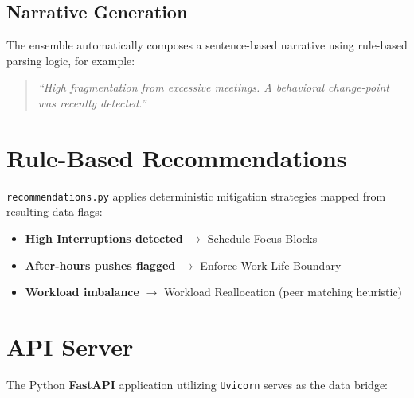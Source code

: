 \documentclass[12pt, a4paper, oneside]{report}
\begin{document}
\subsection{Narrative Generation}

The ensemble automatically composes a sentence-based narrative using rule-based parsing logic, for example:
\begin{quote}
    \emph{``High fragmentation from excessive meetings. A behavioral change-point was recently detected.''}
\end{quote}

\section{Rule-Based Recommendations}
\label{sec:recommendations}

\texttt{recommendations.py} applies deterministic mitigation strategies mapped from resulting data flags:

\begin{itemize}
    \item \textbf{High Interruptions detected} $\rightarrow$ Schedule Focus Blocks
    \item \textbf{After-hours pushes flagged} $\rightarrow$ Enforce Work-Life Boundary
    \item \textbf{Workload imbalance} $\rightarrow$ Workload Reallocation (peer matching heuristic)
\end{itemize}

\section{API Server}
\label{sec:api}

The Python \textbf{FastAPI} application utilizing \texttt{Uvicorn} serves as the data bridge:
\end{document}
